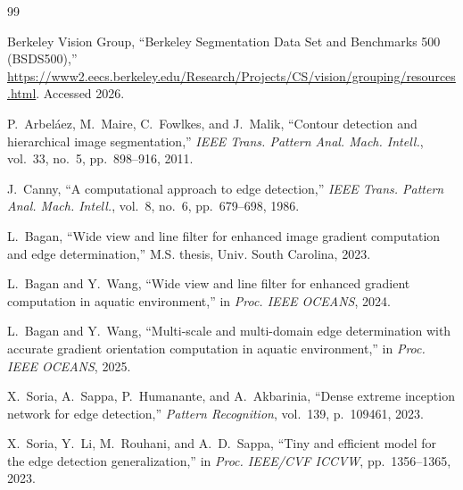 \documentclass[conference]{IEEEtran}
\begin{document}
\begin{thebibliography}{99}

Berkeley Vision Group, ``Berkeley Segmentation Data Set and Benchmarks 500 (BSDS500),'' \url{https://www2.eecs.berkeley.edu/Research/Projects/CS/vision/grouping/resources.html}. Accessed 2026.

P.~Arbel\'{a}ez, M.~Maire, C.~Fowlkes, and J.~Malik, ``Contour detection and hierarchical image segmentation,'' \textit{IEEE Trans. Pattern Anal. Mach. Intell.}, vol.~33, no.~5, pp.~898--916, 2011.

J.~Canny, ``A computational approach to edge detection,'' \textit{IEEE Trans. Pattern Anal. Mach. Intell.}, vol.~8, no.~6, pp.~679--698, 1986.

L.~Bagan, ``Wide view and line filter for enhanced image gradient computation and edge determination,'' M.S. thesis, Univ. South Carolina, 2023.

L.~Bagan and Y.~Wang, ``Wide view and line filter for enhanced gradient computation in aquatic environment,'' in \textit{Proc. IEEE OCEANS}, 2024.

L.~Bagan and Y.~Wang, ``Multi-scale and multi-domain edge determination with accurate gradient orientation computation in aquatic environment,'' in \textit{Proc. IEEE OCEANS}, 2025.

X.~Soria, A.~Sappa, P.~Humanante, and A.~Akbarinia, ``Dense extreme inception network for edge detection,'' \textit{Pattern Recognition}, vol.~139, p.~109461, 2023.

X.~Soria, Y.~Li, M.~Rouhani, and A.~D.~Sappa, ``Tiny and efficient model for the edge detection generalization,'' in \textit{Proc. IEEE/CVF ICCVW}, pp.~1356--1365, 2023.

\end{thebibliography}
\end{document}
